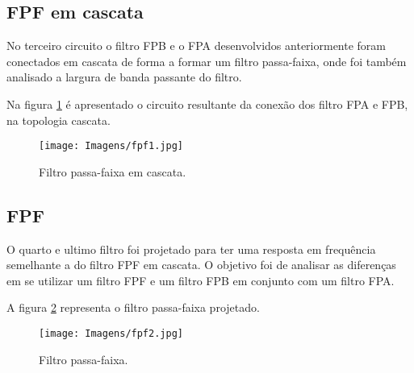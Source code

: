 \subsection{FPF em cascata}
No terceiro circuito o filtro FPB e o FPA desenvolvidos anteriormente foram conectados em cascata de forma a formar um filtro passa-faixa, onde foi também analisado a largura de banda passante do filtro.

Na figura \ref{fFPFC} é apresentado o circuito resultante da conexão dos filtro FPA e FPB, na topologia cascata.

\begin{figure}[H]
    \centering
    \texttt{[image: Imagens/fpf1.jpg]}
    \label{fFPFC}
    \caption{Filtro passa-faixa em cascata.}
\end{figure}

\subsection{FPF}
O quarto e ultimo filtro foi projetado para ter uma resposta em frequência semelhante a do filtro FPF em cascata. O objetivo foi de analisar as diferenças em se utilizar um filtro FPF e um filtro FPB em conjunto com um filtro FPA.

A figura \ref{fFPF} representa o filtro passa-faixa projetado.

\begin{figure}[H]
    \centering
    \texttt{[image: Imagens/fpf2.jpg]}
    \label{fFPF}
    \caption{Filtro passa-faixa.}
\end{figure}